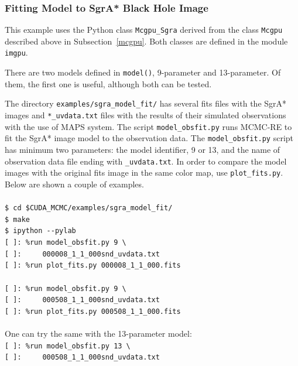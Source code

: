 \documentclass[preprint2]{aastex}
\begin{document}
\subsubsection{Fitting Model to SgrA* Black Hole Image}

This example uses the Python class \verb|Mcgpu_Sgra| derived from the class \verb|Mcgpu| described above in Subsection~\ref{mcgpu}. Both classes are defined in the module \verb|imgpu|.

There are two models defined in \verb|model()|, 9-parameter and 13-parameter. Of them, 
the first one is useful, although both can be tested. 

The directory \verb|examples/sgra_model_fit/| has several fits files with the SgrA* images
and \verb|*_uvdata.txt| files with the results of their simulated observations with the use 
of MAPS system. The script \verb|model_obsfit.py| runs MCMC-RE to fit the SgrA* image model
to the observation data. The \verb|model_obsfit.py| script has minimum two parameters: the 
model identifier, 9 or 13, and the name of observation data file ending with \verb|_uvdata.txt|.
In order to compare the model images with the original fits image in the same color map, use \verb|plot_fits.py|.
Below are shown a couple of examples.\\\\
\verb|$ cd $CUDA_MCMC/examples/sgra_model_fit/| \\
\verb|$ make| \\
\verb|$ ipython --pylab| \\
\verb|[ ]: %run model_obsfit.py 9 \| \\
\verb|[ ]:     000008_1_1_000snd_uvdata.txt| \\
\verb|[ ]: %run plot_fits.py 000008_1_1_000.fits| \\\\
\verb|[ ]: %run model_obsfit.py 9 \| \\
\verb|[ ]:     000508_1_1_000snd_uvdata.txt| \\
\verb|[ ]: %run plot_fits.py 000508_1_1_000.fits| \\\\
One can try the same with the 13-parameter model: \\
\verb|[ ]: %run model_obsfit.py 13 \| \\
\verb|[ ]:     000508_1_1_000snd_uvdata.txt| \\



\clearpage




\end{document}
